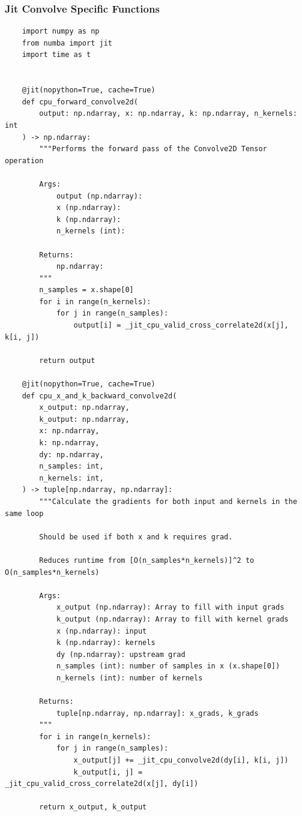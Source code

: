 \documentclass{article}
\begin{document}
    \subsubsection{Jit Convolve Specific Functions}
    \begin{verbatim}
    import numpy as np
    from numba import jit
    import time as t


    @jit(nopython=True, cache=True)
    def cpu_forward_convolve2d(
        output: np.ndarray, x: np.ndarray, k: np.ndarray, n_kernels: int
    ) -> np.ndarray:
        """Performs the forward pass of the Convolve2D Tensor operation

        Args:
            output (np.ndarray):
            x (np.ndarray):
            k (np.ndarray):
            n_kernels (int):

        Returns:
            np.ndarray:
        """
        n_samples = x.shape[0]
        for i in range(n_kernels):
            for j in range(n_samples):
                output[i] = _jit_cpu_valid_cross_correlate2d(x[j], k[i, j])

        return output

    @jit(nopython=True, cache=True)
    def cpu_x_and_k_backward_convolve2d(
        x_output: np.ndarray,
        k_output: np.ndarray,
        x: np.ndarray,
        k: np.ndarray,
        dy: np.ndarray,
        n_samples: int,
        n_kernels: int,
    ) -> tuple[np.ndarray, np.ndarray]:
        """Calculate the gradients for both input and kernels in the same loop

        Should be used if both x and k requires grad.

        Reduces runtime from [O(n_samples*n_kernels)]^2 to O(n_samples*n_kernels)

        Args:
            x_output (np.ndarray): Array to fill with input grads
            k_output (np.ndarray): Array to fill with kernel grads
            x (np.ndarray): input
            k (np.ndarray): kernels
            dy (np.ndarray): upstream grad
            n_samples (int): number of samples in x (x.shape[0])
            n_kernels (int): number of kernels

        Returns:
            tuple[np.ndarray, np.ndarray]: x_grads, k_grads
        """
        for i in range(n_kernels):
            for j in range(n_samples):
                x_output[j] += _jit_cpu_convolve2d(dy[i], k[i, j])
                k_output[i, j] = _jit_cpu_valid_cross_correlate2d(x[j], dy[i])

        return x_output, k_output


\end{verbatim}
\end{document}
